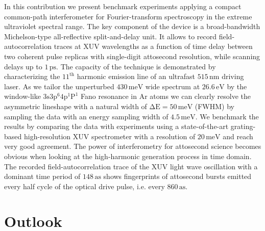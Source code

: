 \documentclass[fleqn,10pt]{wlscirep}
\begin{document}
In this contribution we present benchmark experiments applying a compact common-path interferometer for Fourier-transform spectroscopy in the extreme ultraviolet spectral range. The key component of the device is a broad-bandwidth Michelson-type all-reflective split-and-delay unit. It allows to record field-autocorrelation traces at XUV wavelengths as a function of time delay between two coherent pulse replicas with single-digit attosecond resolution, while scanning delays up to $\mathrm{1\,ps}$. The capacity of the technique is demonstrated by characterizing the $\mathrm{11^{th}}$ harmonic emission line of an ultrafast $\mathrm{515\,nm}$ driving laser. As we tailor the unperturbed $\mathrm{430\,meV}$ wide spectrum at $\mathrm{26.6\,eV}$ by the window-like $\mathrm{3s3p^{6}4p^{1}P^{1}}$ Fano resonance in Ar atoms we can clearly resolve the asymmetric lineshape with a natural width of $\mathrm{\Delta E = 50\,meV}$ (FWHM) by sampling the data with an energy sampling width of $\mathrm{4.5\,meV}$. We benchmark the results by comparing the data with experiments using a state-of-the-art grating-based high-resolution XUV spectrometer with a resolution of $\mathrm{20\,meV}$ and reach very good agreement. The power of interferometry for attosecond science becomes obvious when looking at the high-harmonic generation process in time domain. The recorded field-autocorrelation trace of the XUV light wave oscillation with a dominant time period of $\mathrm{148\,as}$ shows fingerprints of attosecond bursts emitted every half cycle of the optical drive pulse, i.e. every $\mathrm{860\,as}$.\\

\section{Outlook}
\end{document}

